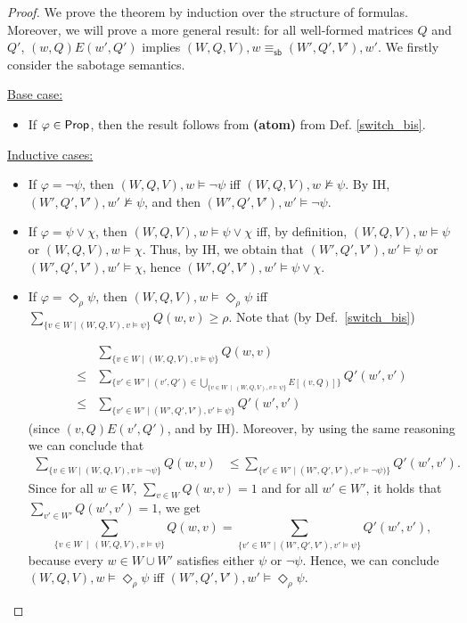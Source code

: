 \begin{proof}
    We prove the theorem by induction over the structure of formulas. Moreover, we will prove a more general result: for all well-formed matrices ${Q}$ and ${Q'}$, $(w,{Q})E(w',{Q}')$ implies $(W,{Q},V),w\equiv_{\mathsf{sb}}(W',{Q}',V'),w'$.  
    We firstly consider the sabotage semantics.
    
    \medskip
    \noindent \underline{Base case:}
    \begin{itemize}
        \item If $\varphi\in\mathsf{Prop}$, then the result follows from \textbf{(atom)}  from Def. \ref{switch_bis}.
    \end{itemize}
    
    \noindent \underline{Inductive cases:}
    \begin{itemize}
        \item If $\varphi=\neg\psi$, then $(W,{Q},V),w\models\neg\psi$ iff $(W,{Q},V),w\not\models\psi$. By IH, $(W',{Q}',V'),w'\not\models\psi$, and then 
        $(W',{Q}',V'),w'\models\neg\psi$.

        \item If $\varphi=\psi\vee\chi$, then $(W,{Q},V),w\models\psi\vee\chi$ iff, by definition, $(W,{Q},V),w\models\psi$ or $(W,{Q},V),w\models\chi$. Thus, by IH, we obtain that $(W',{Q}',V'),w'\models\psi$ or $(W',{Q}',V'),w'\models\chi$, hence $(W',{Q}',V'),w'\models\psi\vee\chi$.

        \item If $\varphi=\Diamond_\rho \psi$, then $(W,{Q},V),w\models \Diamond_\rho \psi$ iff $\sum_{\{v \in W \mid (W,{Q},V),v\models\psi\}} {Q}(w,v) \geq \rho$. Note that (by Def.~\ref{switch_bis}) 

        \[
            \begin{aligned}
            & \sum_{\{v\in W \mid (W,{Q},V),v\models\psi\}} {Q}(w,v) \\
            \leq & \sum_{\{v'\in W' \mid  (v',{Q}')\in \bigcup_{\{v \in W \ \mid \ (W,{Q},V),v\models\psi\}}E[(v,{Q})]\}} {Q}'(w',v') \\ 
            \leq & \sum_{\{v' \in W' \mid  (W',{Q}',V'),v'\models\psi\}} {Q}'(w',v')
            \end{aligned}    
        \]
        (since $(v,{Q})E(v',{Q}')$, and by IH). Moreover, by using the same reasoning we can conclude that
        \[
            \begin{aligned}
            \sum_{\{v \in W \mid  (W,{Q},V),v\models\neg\psi\}}{Q}(w,v) &\leq 
            \sum_{\{v' \in W' \mid (W',{Q}',V'),v'\models\neg\psi)\}} {Q}'(w',v').
            \end{aligned}
        \]
        Since for all $w\in W$, $\sum_{v \in W}{Q}(w,v)=1$ and for all $w'\in W'$,  it holds that $\sum_{v' \in W'}{Q}(w',v')=1$, we get  
        \[
            \sum_{\{v\in W \ \mid \ (W,{Q},V),v\models\psi\}}{Q}(w,v)= \sum_{\{v' \in W' \mid (W',{Q}',V'),v'\models\psi\}} {Q}'(w',v'),
        \]  
        because every $w\in W\cup W'$  satisfies either $\psi$  or $\neg\psi$. 
        Hence, we can conclude $(W,{Q},V),w\models \Diamond_\rho \psi$ iff 
        $(W',{Q}',V'),w'\models \Diamond_\rho \psi$.


\end{itemize}
\end{proof}
